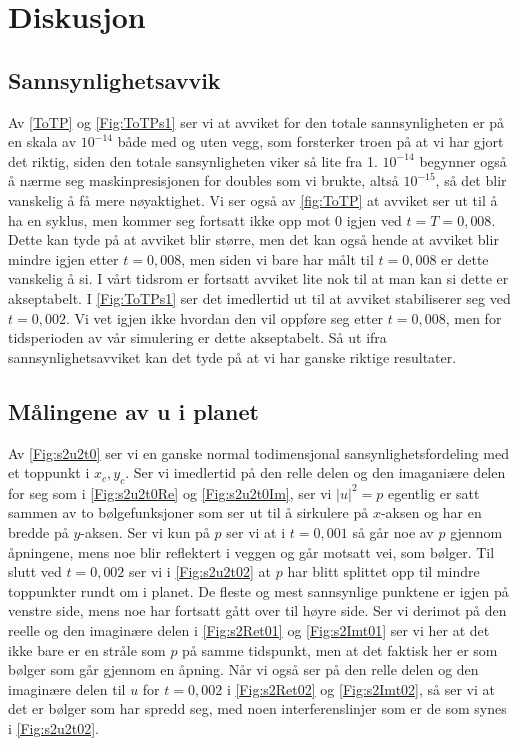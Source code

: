\documentclass[reprint,english,notitlepage]{revtex4-2}  %
\begin{document}
\section{Diskusjon}
\subsection{Sannsynlighetsavvik}
Av \autoref{ToTP} og \autoref{Fig:ToTPs1} ser vi at avviket for den totale sannsynligheten er på en skala av $10^{-14}$ både med og uten vegg, som forsterker troen på at vi har gjort det riktig, siden den totale sansynligheten viker så lite fra 1. $10^{-14}$ begynner også å nærme seg maskinpresisjonen for doubles som vi brukte, altså $10^{-15}$, så det blir vanskelig å få mere nøyaktighet. Vi ser også av \ref{fig:ToTP} at avviket ser ut til å ha en syklus, men kommer seg fortsatt ikke opp mot 0 igjen ved $t=T=0,008$. Dette kan tyde på at avviket blir større, men det kan også hende at avviket blir mindre igjen etter $t=0,008$, men siden vi bare har målt til $t=0,008$ er dette vanskelig å si. I vårt tidsrom er fortsatt avviket lite nok til at man kan si dette er akseptabelt. I \autoref{Fig:ToTPs1} ser det imedlertid ut til at avviket stabiliserer seg ved $t=0,002$. Vi vet igjen ikke hvordan den vil oppføre seg etter $t=0,008$, men for tidsperioden av vår simulering er dette akseptabelt. Så ut ifra sannsynlighetsavviket kan det tyde på at vi har ganske riktige resultater. 
\subsection{Målingene av u i planet}
Av \autoref{Fig:s2u2t0} ser vi en ganske normal todimensjonal sansynlighetsfordeling med et toppunkt i $x_c, y_c$. Ser vi imedlertid på den relle delen og den imaganiære delen for seg som i \autoref{Fig:s2u2t0Re} og \autoref{Fig:s2u2t0Im}, ser vi $|u|^2=p$ egentlig er satt sammen av to bølgefunksjoner som ser ut til å sirkulere på $x$-aksen og har en bredde på $y$-aksen. Ser vi kun på $p$ ser vi at i $t=0,001$ så går noe av $p$ gjennom åpningene, mens noe blir reflektert i veggen og går motsatt vei, som bølger. Til slutt ved $t=0,002$ ser vi i \autoref{Fig:s2u2t02} at $p$ har blitt splittet opp til mindre toppunkter rundt om i planet. De fleste og mest sannsynlige punktene er igjen på venstre side, mens noe har fortsatt gått over til høyre side.
\newline
Ser vi derimot på den reelle og den imaginære delen i \autoref{Fig:s2Ret01} og \autoref{Fig:s2Imt01} ser vi her at det ikke bare er en stråle som $p$ på samme tidspunkt, men at det faktisk her er som bølger som går gjennom en åpning. Når vi også ser på den relle delen og den imaginære delen til $u$ for $t=0,002$ i \autoref{Fig:s2Ret02} og \autoref{Fig:s2Imt02}, så ser vi at det er bølger som har spredd seg, med noen interferenslinjer som er de som synes i \autoref{Fig:s2u2t02}.
\end{document}
